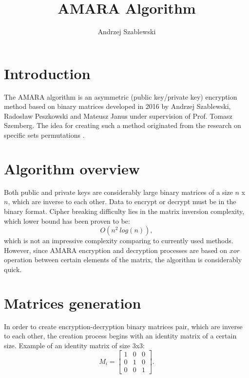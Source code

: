 \documentclass{article}
\author{Andrzej Szablewski}
\title{AMARA Algorithm}
\begin{document}
\maketitle

\section{Introduction}
    The AMARA algorithm is an asymmetric (public key/private key) encryption method based on binary matrices  developed in 2016 by Andrzej Szablewski, Radosław Peszkowski and Mateusz Janus under supervision of Prof. Tomasz Szemberg. The idea for creating such a method originated from the research on specific sets permutations \cite{research}.

\section{Algorithm overview}
    Both public and private keys are considerably large binary matrices of a size $n$ x $n$, which are inverse to each other. Data to encrypt or decrypt must be in the binary format. Cipher breaking difficulty lies in the matrix inversion complexity, which lower bound has been proven \cite{matrix_proof} to be: $$O(n^2\ log(n)),$$ which is not an impressive complexity comparing to currently used methods. However, since AMARA encryption and decryption processes are based on $xor$ operation between certain elements of the matrix, the algorithm is considerably quick.

\section{Matrices generation}
    In order to create encryption-decryption binary matrices pair, which are inverse to each other, the creation process begins with an identity matrix of a certain size. Example of an identity matrix of size 3x3:
    $$M_i=\begin{bmatrix}
    1 & 0 & 0\\
    0 & 1 & 0\\
    0 & 0 & 1
    \end{bmatrix}.$$
\end{document}
